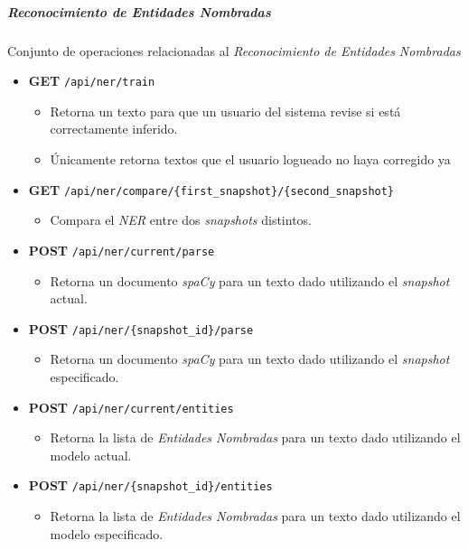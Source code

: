 \documentclass[12pt,a4paper,]{scrartcl}
\providecommand{\tightlist}{%
  \setlength{\itemsep}{0pt}\setlength{\parskip}{0pt}}
\let\oldsubparagraph\subparagraph
\renewcommand{\subparagraph}[1]{\oldsubparagraph{#1}\mbox{}}
\begin{document}
\hypertarget{reconocimiento-de-entidades-nombradas}{%
\subparagraph{Reconocimiento de Entidades Nombradas}\label{reconocimiento-de-entidades-nombradas}}

Conjunto de operaciones relacionadas al \emph{Reconocimiento de Entidades Nombradas}

\begin{itemize}
\tightlist
\item
  \textbf{GET} \texttt{/api/ner/train}

  \begin{itemize}
  \tightlist
  \item
    Retorna un texto para que un usuario del sistema revise si está correctamente inferido.
  \item
    Únicamente retorna textos que el usuario logueado no haya corregido ya
  \end{itemize}
\item
  \textbf{GET} \texttt{/api/ner/compare/\{first\_snapshot\}/\{second\_snapshot\}}

  \begin{itemize}
  \tightlist
  \item
    Compara el \emph{NER} entre dos \emph{snapshots} distintos.
  \end{itemize}
\item
  \textbf{POST} \texttt{/api/ner/current/parse}

  \begin{itemize}
  \tightlist
  \item
    Retorna un documento \emph{spaCy} para un texto dado utilizando el \emph{snapshot} actual.
  \end{itemize}
\item
  \textbf{POST} \texttt{/api/ner/\{snapshot\_id\}/parse}

  \begin{itemize}
  \tightlist
  \item
    Retorna un documento \emph{spaCy} para un texto dado utilizando el \emph{snapshot} especificado.
  \end{itemize}
\item
  \textbf{POST} \texttt{/api/ner/current/entities}

  \begin{itemize}
  \tightlist
  \item
    Retorna la lista de \emph{Entidades Nombradas} para un texto dado utilizando el modelo actual.
  \end{itemize}
\item
  \textbf{POST} \texttt{/api/ner/\{snapshot\_id\}/entities}

  \begin{itemize}
  \tightlist
  \item
    Retorna la lista de \emph{Entidades Nombradas} para un texto dado utilizando el modelo especificado.
  \end{itemize}
\end{itemize}
\end{document}
